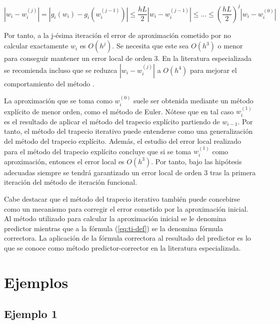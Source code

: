 \documentclass{article}
\theoremstyle{theorem-style}  %
\theoremstyle{definition-style}
\theoremstyle{example-style}
\begin{document}
	$$ \left|w_i - w_i^{(j)}\right| = \left|g_i(w_i) - g_i(w_i^{(j-1)})\right| \le \frac{hL}{2} \left|w_i - w_i^{(j-1)}\right| \le \ldots \le \left(\frac{hL}{2}\right)^j \left|w_i - w_i^{(0)}\right| $$

	Por tanto, a la j-ésima iteración el error de aproximación cometido por no calcular exactamente $w_i$ es $O(h^j)$. Se necesita que este sea $O(h^3)$ o menor para conseguir mantener un error local de orden $3$. En la literatura especializada se recomienda incluso que se reduzca $\left|w_i - w_i^{(j)}\right|$ a $O(h^4)$ para mejorar el comportamiento del método \cite{akitson}.

	La aproximación que se toma como $w_i^{(0)}$ suele ser obtenida mediante un método explícito de menor orden, como el método de Euler. Nótese que en tal caso $w_i^{(1)}$ es el resultado de aplicar el método del trapecio explícito partiendo de $w_{i-1}$. Por tanto, el método del trapecio iterativo puede entenderse como una generalización del método del trapecio explícito. Además, el estudio del error local realizado para el método del trapecio explícito concluye que si se toma $w_i^{(1)}$ como aproximación, entonces el error local es $O(h^3)$. Por tanto, bajo las hipótesis adecuadas siempre se tendrá garantizado un error local de orden 3 tras la primera iteración del método de iteración funcional.

	Cabe destacar que el método del trapecio iterativo también puede concebirse como un mecanismo para corregir el error cometido por la aproximación inicial. Al método utilizado para calcular la aproximación inicial se le denomina predictor mientras que a la fórmula (\ref{eq:ti-def}) se la denomina fórmula correctora. La aplicación de la fórmula correctora al resultado del predictor es lo que se conoce como método predictor-corrector en la literatura especializada.


\section{Ejemplos} \label{ejemplos}

\subsection{Ejemplo 1} \label{ejemplo1}
\end{document}
